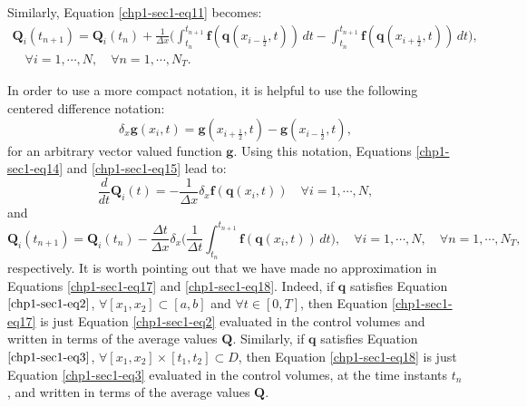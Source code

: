 Similarly, Equation \eqref{chp1-sec1-eq11} becomes:
\begin{equation}
        \label{chp1-sec1-eq15}
	\begin{aligned}
		\mathbf{Q}_i(t_{n+1}) =  \mathbf{Q}_i(t_n) +
		\frac{1}{\Delta x}\bigg( \int_{t_n}^{t_{n+1}}
        	\mathbf{f}(\mathbf{q}(x_{i-\frac{1}{2}}, t)) \,dt -
		\int_{t_n}^{t_{n+1}}\mathbf{f}(\mathbf{q}(x_{i+\frac{1}{2}}, t)) \,dt \bigg),
       		\\
		\quad \forall i = 1, \cdots, N,
		\quad \forall n = 1, \cdots, N_T.
	\end{aligned}
\end{equation}

In order to use a more compact notation, it is helpful to use the following centered difference notation:
\begin{equation}
	\label{chp1-sec1-eq16}
	\delta_x \mathbf{g}(x_i,t) = 
	\mathbf{g}(x_{i+\frac{1}{2}},t) - 
	\mathbf{g}(x_{i-\frac{1}{2}},t),
\end{equation}
for an arbitrary vector valued function $\mathbf{g}$. 
Using this notation, Equations \eqref{chp1-sec1-eq14}
and \eqref{chp1-sec1-eq15} lead to:
\begin{equation}
        \label{chp1-sec1-eq17}
        \frac{d}{dt} \mathbf{Q}_i(t) = -\frac{1}{\Delta x}
	\delta_x \mathbf{f}(\mathbf{q}(x_{i},t))
        \quad \forall i = 1, \cdots, N,
\end{equation}
and
\begin{equation}
        \label{chp1-sec1-eq18}
        \mathbf{Q}_i(t_{n+1}) =  \mathbf{Q}_i(t_n) -
	\frac{\Delta t}{  \Delta x} \delta _x\bigg( \frac{1}{\Delta t}\int_{t_n}^{t_{n+1}}
        \mathbf{f}(\mathbf{q}(x_{i}, t)) \,dt \bigg),
        \quad \forall i = 1, \cdots, N,
        \quad \forall n = 1, \cdots, N_T,
\end{equation}
respectively.
It is worth pointing out that we have made no approximation in Equations
\eqref{chp1-sec1-eq17} and \eqref{chp1-sec1-eq18}. Indeed, if $\mathbf{q}$ satisfies Equation
$\eqref{chp1-sec1-eq2}$, $\forall [x_1, x_2] \subset [a,b]$ and $\forall t \in [0,T]$,
then Equation \eqref{chp1-sec1-eq17} is just Equation
\eqref{chp1-sec1-eq2} evaluated in the control volumes and written
in terms of the average values $\mathbf{Q}$. 
Similarly, if $\mathbf{q}$ satisfies Equation
$\eqref{chp1-sec1-eq3}$, $\forall [x_1, x_2] \times [t_1, t_2] \subset D$,
then Equation \eqref{chp1-sec1-eq18} is just Equation
\eqref{chp1-sec1-eq3} evaluated in the control volumes,
at the time instants $t_n$, and written
in terms of the average values $\mathbf{Q}$.

